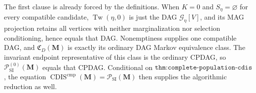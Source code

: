 The first clause is already forced by the definitions.  When \(K=0\) and \(S_\eta=\varnothing\) for every compatible candidate, \(\operatorname{Tw}(\eta,0)\) is just the DAG \(\mathcal G_\eta[V]\), and its MAG projection retains all vertices with neither marginalization nor selection conditioning, hence equals that DAG.  Nonemptiness supplies one compatible DAG, and \(\mathfrak C_D(\mathbf M)\) is exactly its ordinary DAG Markov equivalence class.  The invariant endpoint representative of this class is the ordinary CPDAG, so \(\mathcal P_{\mathrm{SI}}^{(0)}(\mathbf M)\) equals that CPDAG.  Conditional on \(\texttt{thm:complete-population-cdis}\), the equation \(\operatorname{CDIS}^{\mathrm{cmp}}(\mathbf M)=\mathcal P_{\mathrm{SI}}(\mathbf M)\) then supplies the algorithmic reduction as well.